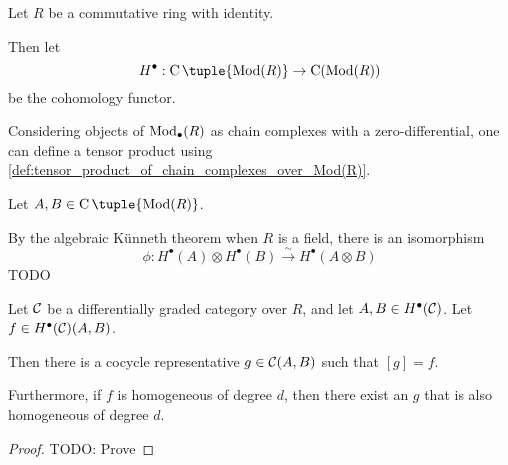 \begin{notation}
    Let \( R \) be a commutative ring with identity.

    Then let
    \[
        H^\bullet: \C\tuple{\Mod(R)} \to \C(\Mod(R))
    \]
    be the cohomology functor.
\end{notation}

\begin{fact}
    \label{fact:massey_product_in_dg_cat/massey_product_definition/algebraic_kunneth_isomorphism}
    Considering objects of \( \operatorname{Mod}_{\bullet}(R) \) as chain complexes with a zero-differential, one can define a tensor product using \autoref{def:tensor_product_of_chain_complexes_over_Mod(R)}.

    Let \( A, B \in \C\tuple{\Mod(R)} \).

    By the algebraic Künneth theorem when \( R \) is a field, there is an isomorphism
    \[
        \phi: H^\bullet(A) \otimes H^\bullet(B) \stackrel{\sim}{\to} H^\bullet(A \otimes B)
    \]
    TODO
\end{fact}

\begin{lemma}
    \label{lem:massey_product_in_dg_cat/massey_product_definition/exist_lifting_h_star}
    Let \( {\mathcal{C}} \) be a differentially graded category over \( R \), and let \( A, B \in H^\bullet({\mathcal{C}}) \). Let \( f \in H^\bullet({\mathcal{C}})(A, B) \).

    Then there is a cocycle representative \( g \in {\mathcal{C}}(A, B) \) such that \( [g] = f \).

    Furthermore, if \( f \) is homogeneous of degree \( d \), then there exist an \( g \) that is also homogeneous of degree \( d \).
\end{lemma}
\begin{proof}
    TODO: Prove
\end{proof}

